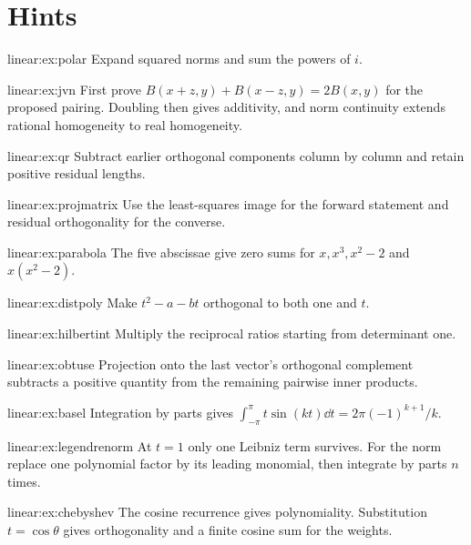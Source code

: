 \section{Hints}
\begin{hint}{linear:ex:polar}
Expand squared norms and sum the powers of $i$.
\end{hint}
\begin{hint}{linear:ex:jvn}
First prove $B(x+z,y)+B(x-z,y)=2B(x,y)$ for the proposed pairing. Doubling then gives additivity, and norm continuity extends rational homogeneity to real homogeneity.
\end{hint}
\begin{hint}{linear:ex:qr}
Subtract earlier orthogonal components column by column and retain positive residual lengths.
\end{hint}
\begin{hint}{linear:ex:projmatrix}
Use the least-squares image for the forward statement and residual orthogonality for the converse.
\end{hint}
\begin{hint}{linear:ex:parabola}
The five abscissae give zero sums for $x,x^3,x^2-2$ and $x(x^2-2)$.
\end{hint}
\begin{hint}{linear:ex:distpoly}
Make $t^2-a-bt$ orthogonal to both one and $t$.
\end{hint}
\begin{hint}{linear:ex:hilbertint}
Multiply the reciprocal ratios starting from determinant one.
\end{hint}
\begin{hint}{linear:ex:obtuse}
Projection onto the last vector's orthogonal complement subtracts a positive quantity from the remaining pairwise inner products.
\end{hint}
\begin{hint}{linear:ex:basel}
Integration by parts gives $\int_{-\pi}^\pi t\sin(kt)\dd t=2\pi(-1)^{k+1}/k$.
\end{hint}
\begin{hint}{linear:ex:legendrenorm}
At $t=1$ only one Leibniz term survives. For the norm replace one polynomial factor by its leading monomial, then integrate by parts $n$ times.
\end{hint}
\begin{hint}{linear:ex:chebyshev}
The cosine recurrence gives polynomiality. Substitution $t=\cos\theta$ gives orthogonality and a finite cosine sum for the weights.
\end{hint}
